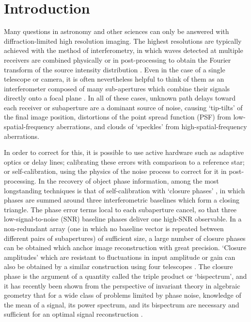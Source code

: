 \documentclass[modern]{aastex63}
\begin{document}
\section{Introduction} 
\label{sec:intro}
Many questions in astronomy and other sciences can only be answered with diffraction-limited high resolution imaging. The highest resolutions are typically achieved with the method of interferometry, in which waves detected at multiple receivers are combined physically or in post-processing to obtain the Fourier transform of the source intensity distribution \citep{vc34,zernike38}. Even in the case of a single telescope or camera, it is often nevertheless helpful to think of them as an interferometer composed of many sub-apertures which combine their signals directly onto a focal plane \citep[a `Fizeau interferometer':][]{fizeau1868}. In all of these cases, unknown path delays toward each receiver or subaperture are a dominant source of noise, causing `tip-tilts' of the final image position, distortions of the point spread function (PSF) from low-spatial-frequency aberrations, and clouds of `speckles' from high-spatial-frequency aberrations.

In order to correct for this, it is possible to use active hardware such as adaptive optics or delay lines; calibrating these errors with comparison to a reference star; or self-calibration, using the physics of the noise process to correct for it in post-processing.
In the recovery of object phase information, among the most longstanding techniques is that of self-calibration with `closure phases' \citep[introduced in the context of radio astronomy by][]{jennison58}, in which phases are summed around three interferometric baselines which form a closing triangle. The phase error terms local to each subaperture cancel, so that three low-signal-to-noise (SNR) baseline phases deliver one high-SNR observable. In a non-redundant array (one in which no baseline vector is repeated between different pairs of subapertures) of sufficient size, a large number of closure phases can be obtained which anchor image reconstruction with great precision. `Closure amplitudes' which are resistant to fluctuations in input amplitude or gain can also be obtained by a similar construction using four telescopes \citep{twiss60,blackburn20}. The closure phase is the argument of a quantity called the triple product or `bispectrum', and it has recently been shown from the perspective of invariant theory in algebraic geometry that for a wide class of problems limited by phase noise, knowledge of the mean of a signal, its power spectrum, and its bispectrum are necessary and sufficient for an optimal signal reconstruction \citep{bandeira17}.
\end{document}
